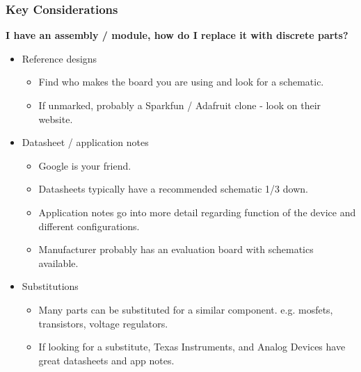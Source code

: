 \documentclass[t]{beamer}
\begin{document}
\begin{frame}
\frametitle{Key Considerations}
\large{\textbf{I have an assembly / module, how do I replace it with discrete parts?}}
\vspace{1mm}
\begin{itemize}
	\item Reference designs 
	\begin{itemize}
		\item Find who makes the board you are using and look for a schematic.
		\item If unmarked, probably a Sparkfun / Adafruit clone - look on their website.
	\end{itemize} 
	\item Datasheet / application notes
	\begin{itemize}
		\item Google is your friend.
		\item Datasheets typically have a recommended schematic 1/3 down. 
		\item Application notes go into more detail regarding function of the device and different configurations. 
		\item Manufacturer probably has an evaluation board with schematics available.
	\end{itemize}
	\item Substitutions
	\begin{itemize}
		\item Many parts can be substituted for a similar component. e.g. mosfets, transistors, voltage regulators. 
		\item If looking for a substitute, Texas Instruments, and Analog Devices have great datasheets and app notes. 
	\end{itemize}
\end{itemize}
\end{frame}

\end{document}
